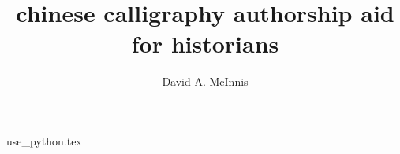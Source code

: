 \documentclass{ewuthesis}
\begin{document}
    \title{chinese calligraphy authorship aid for historians}
    \author{David A. McInnis}    
    \frontmatter
%    
    \mainmatter
    {use_python.tex}
    
    
    
    
\end{document}
